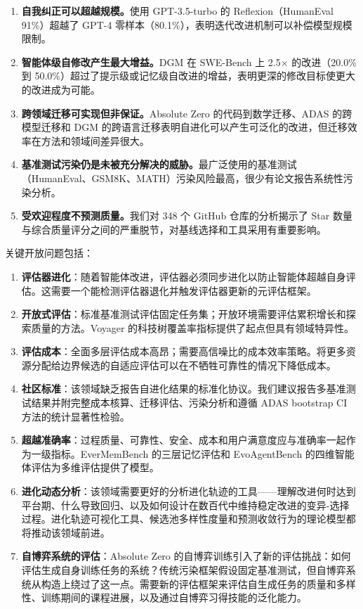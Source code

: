 \begin{enumerate}
\item \textbf{自我纠正可以超越规模。}使用 GPT-3.5-turbo 的 Reflexion（HumanEval 91\%）超越了 GPT-4 零样本（80.1\%），表明迭代改进机制可以补偿模型规模限制。

\item \textbf{智能体级自修改产生最大增益。}DGM 在 SWE-Bench 上 2.5$\times$ 的改进（20.0\% 到 50.0\%）超过了提示级或记忆级自改进的增益，表明更深的修改目标使更大的改进成为可能。

\item \textbf{跨领域迁移可实现但非保证。}Absolute Zero 的代码到数学迁移、ADAS 的跨模型迁移和 DGM 的跨语言迁移表明自进化可以产生可泛化的改进，但迁移效率在方法和领域间差异很大。

\item \textbf{基准测试污染仍是未被充分解决的威胁。}最广泛使用的基准测试（HumanEval、GSM8K、MATH）污染风险最高，很少有论文报告系统性污染分析。

\item \textbf{受欢迎程度不预测质量。}我们对 348 个 GitHub 仓库的分析揭示了 Star 数量与综合质量评分之间的严重脱节，对基线选择和工具采用有重要影响。
\end{enumerate}

关键开放问题包括：

\begin{enumerate}[nosep]
\item \textbf{评估器进化}：随着智能体改进，评估器必须同步进化以防止智能体超越自身评估。这需要一个能检测评估器退化并触发评估器更新的元评估框架。

\item \textbf{开放式评估}：标准基准测试评估固定任务集；开放环境需要评估累积增长和探索质量的方法。Voyager 的科技树覆盖率指标提供了起点但具有领域特异性。

\item \textbf{评估成本}：全面多层评估成本高昂；需要高信噪比的成本效率策略。将更多资源分配给边界候选的自适应评估可以在不牺牲可靠性的情况下降低成本。

\item \textbf{社区标准}：该领域缺乏报告自进化结果的标准化协议。我们建议报告多基准测试结果并附完整成本核算、迁移评估、污染分析和遵循 ADAS bootstrap CI 方法的统计显著性检验。

\item \textbf{超越准确率}：过程质量、可靠性、安全、成本和用户满意度应与准确率一起作为一级指标。EverMemBench 的三层记忆评估和 EvoAgentBench 的四维智能体评估为多维评估提供了模型。

\item \textbf{进化动态分析}：该领域需要更好的分析进化轨迹的工具——理解改进何时达到平台期、什么导致回归、以及如何设计在数百代中维持稳定改进的变异-选择过程。进化轨迹可视化工具、候选池多样性度量和预测收敛行为的理论模型都将推动该领域前进。

\item \textbf{自博弈系统的评估}：Absolute Zero 的自博弈训练引入了新的评估挑战：如何评估生成自身训练任务的系统？传统污染框架假设固定基准测试，但自博弈系统从构造上绕过了这一点。需要新的评估框架来评估自生成任务的质量和多样性、训练期间的课程进展，以及通过自博弈习得技能的泛化能力。
\end{enumerate}

